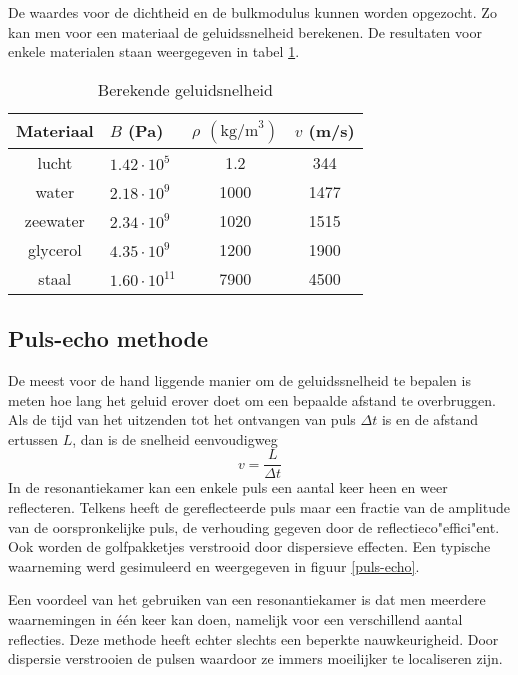 De waardes voor de dichtheid en de bulkmodulus kunnen worden opgezocht. Zo kan 
men voor een materiaal de geluidssnelheid berekenen. De resultaten voor 
enkele materialen staan weergegeven in tabel \ref{speedtable}. 

\begin{table}[htb]
\caption{Berekende geluidsnelheid}
\label{speedtable}
\begin{center}
\begin{tabular}{c||lcc}
Materiaal & $B$ (Pa) & $\rho$ $(\textrm{kg/m}^3)$ & $v$ (m/s) \\\hline
lucht	& $1.42 \cdot 10^5$	& 1.2  & 344  \\
water	& $2.18 \cdot 10^9$	& 1000 & 1477 \\
zeewater& $2.34 \cdot 10^9$	& 1020 & 1515 \\
glycerol& $4.35 \cdot 10^9$	& 1200 & 1900 \\
staal	& $1.60 \cdot 10^{11}$	& 7900 & 4500 \\
\end{tabular}
\end{center}
\end{table}

\subsection{Puls-echo methode}
De meest voor de hand liggende manier om de geluidssnelheid te bepalen is meten 
hoe lang het geluid erover doet om een bepaalde afstand te overbruggen. Als de 
tijd van het uitzenden tot het ontvangen van puls $\Delta t$ is en de 
afstand ertussen $L$, dan is de snelheid eenvoudigweg
$$
v = \frac{L}{\Delta t}
$$
In de resonantiekamer kan een enkele puls een aantal keer heen en weer 
reflecteren. Telkens heeft de gereflecteerde puls maar een fractie van de 
amplitude van de oorspronkelijke puls, de verhouding gegeven door de 
reflectieco"effici"ent.  Ook worden de golfpakketjes verstrooid door 
dispersieve effecten. Een typische waarneming werd gesimuleerd en weergegeven 
in figuur \ref{puls-echo}. 


Een voordeel van het gebruiken van een resonantiekamer is dat
men meerdere waarnemingen in \'e\'en keer kan doen, namelijk voor een 
verschillend aantal reflecties.
Deze methode heeft echter slechts een beperkte nauwkeurigheid. Door 
dispersie verstrooien de pulsen waardoor ze immers moeilijker te 
localiseren zijn.

